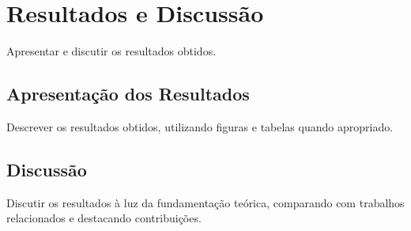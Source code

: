 \chapter{Resultados e Discussão}
\label{chap:resultados}

Apresentar e discutir os resultados obtidos.

\section{Apresentação dos Resultados}

Descrever os resultados obtidos, utilizando figuras e tabelas quando
apropriado.



\section{Discussão}

Discutir os resultados à luz da fundamentação teórica, comparando
com trabalhos relacionados e destacando contribuições.
